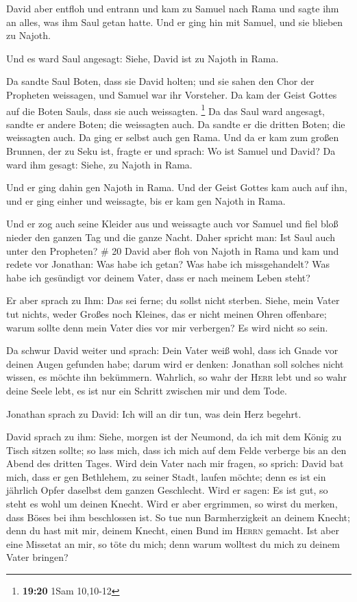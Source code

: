  David aber entfloh und entrann und kam zu Samuel nach
Rama und sagte ihm an alles, was ihm Saul getan hatte. Und er ging hin
mit Samuel, und sie blieben zu Najoth.

 Und es ward Saul angesagt: Siehe, David ist zu Najoth in
Rama.

 Da sandte Saul Boten, dass sie David holten; und sie
sahen den Chor der Propheten weissagen, und Samuel war ihr Vorsteher. Da
kam der Geist Gottes auf die Boten Sauls, dass sie auch weissagten.
\footnote{\textbf{19:20} 1Sam 10,10-12}  Da das Saul ward
angesagt, sandte er andere Boten; die weissagten auch. Da sandte er die
dritten Boten; die weissagten auch.  Da ging er selbst
auch gen Rama. Und da er kam zum großen Brunnen, der zu Seku ist, fragte
er und sprach: Wo ist Samuel und David? Da ward ihm gesagt: Siehe, zu
Najoth in Rama.

 Und er ging dahin gen Najoth in Rama. Und der Geist
Gottes kam auch auf ihn, und er ging einher und weissagte, bis er kam
gen Najoth in Rama.

 Und er zog auch seine Kleider aus und weissagte auch vor
Samuel und fiel bloß nieder den ganzen Tag und die ganze Nacht. Daher
spricht man: Ist Saul auch unter den Propheten? \# 20 
David aber floh von Najoth in Rama und kam und redete vor Jonathan: Was
habe ich getan? Was habe ich missgehandelt? Was habe ich gesündigt vor
deinem Vater, dass er nach meinem Leben steht?

 Er aber sprach zu Ihm: Das sei ferne; du sollst nicht
sterben. Siehe, mein Vater tut nichts, weder Großes noch Kleines, das er
nicht meinen Ohren offenbare; warum sollte denn mein Vater dies vor mir
verbergen? Es wird nicht so sein.

 Da schwur David weiter und sprach: Dein Vater weiß wohl,
dass ich Gnade vor deinen Augen gefunden habe; darum wird er denken:
Jonathan soll solches nicht wissen, es möchte ihn bekümmern. Wahrlich,
so wahr der \textsc{Herr} lebt und so wahr deine Seele lebt, es ist nur
ein Schritt zwischen mir und dem Tode.

 Jonathan sprach zu David: Ich will an dir tun, was dein
Herz begehrt.

 David sprach zu ihm: Siehe, morgen ist der Neumond, da
ich mit dem König zu Tisch sitzen sollte; so lass mich, dass ich mich
auf dem Felde verberge bis an den Abend des dritten Tages.
 Wird dein Vater nach mir fragen, so sprich: David bat
mich, dass er gen Bethlehem, zu seiner Stadt, laufen möchte; denn es ist
ein jährlich Opfer daselbst dem ganzen Geschlecht.  Wird
er sagen: Es ist gut, so steht es wohl um deinen Knecht. Wird er aber
ergrimmen, so wirst du merken, dass Böses bei ihm beschlossen ist.
 So tue nun Barmherzigkeit an deinem Knecht; denn du hast
mit mir, deinem Knecht, einen Bund im \textsc{Herrn} gemacht. Ist aber
eine Missetat an mir, so töte du mich; denn warum wolltest du mich zu
deinem Vater bringen?

